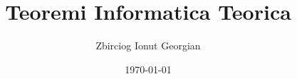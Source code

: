 \documentclass{article}
\title{Teoremi Informatica Teorica}
\author{Zbirciog Ionut Georgian}
\date{\today}
\begin{document}
\maketitle

\begin{flushleft}

\tableofcontents
\newpage








\end{flushleft}
\end{document}
